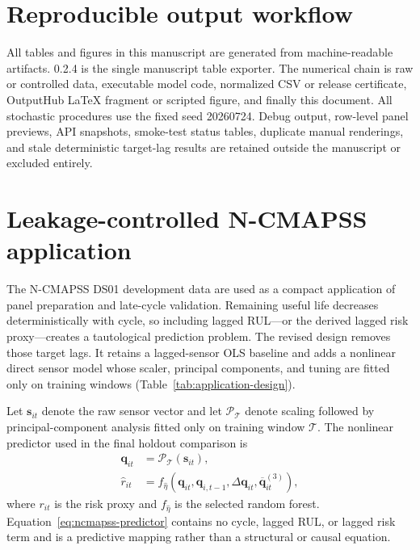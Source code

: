 \documentclass[article]{jss}
\begin{document}
\section{Reproducible output workflow}
All tables and figures in this manuscript are generated from machine-readable artifacts.  0.2.4 is the single manuscript table exporter. The numerical chain is raw or controlled data, executable
model code, normalized CSV or release certificate, OutputHub LaTeX fragment or scripted figure, and finally
this document. All stochastic procedures use the fixed seed 20260724. Debug output,
row-level panel previews, API snapshots, smoke-test status tables, duplicate manual renderings, and stale
deterministic target-lag results are retained outside the manuscript or excluded entirely.

\section{Leakage-controlled N-CMAPSS application}
The N-CMAPSS DS01 development data are used as a compact application of panel preparation and late-cycle
validation. Remaining useful life decreases deterministically with cycle, so including lagged RUL---or the
derived lagged risk proxy---creates a tautological prediction problem. The revised design removes those target
lags. It retains a lagged-sensor OLS baseline and adds a nonlinear direct sensor model whose scaler, principal
components, and tuning are fitted only on training windows (Table~\ref{tab:application-design}).

Let $\mathbf{s}_{it}$ denote the raw sensor vector and let $\mathcal{P}_\mathcal{T}$
denote scaling followed by principal-component analysis fitted only on training window
$\mathcal{T}$. The nonlinear predictor used in the final holdout comparison is
\begin{equation}
\label{eq:ncmapss-predictor}
\begin{aligned}
\mathbf{q}_{it} &= \mathcal{P}_\mathcal{T}(\mathbf{s}_{it}), \\
\widehat{r}_{it}
  &= f_{\widehat{\eta}}\!\left(
     \mathbf{q}_{it},\mathbf{q}_{i,t-1},
     \Delta\mathbf{q}_{it},\overline{\mathbf{q}}_{it}^{(3)}
     \right),
\end{aligned}
\end{equation}
where $r_{it}$ is the risk proxy and $f_{\widehat{\eta}}$ is the selected random
forest. Equation~\ref{eq:ncmapss-predictor} contains no cycle, lagged RUL, or lagged
risk term and is a predictive mapping rather than a structural or causal equation.
\end{document}
